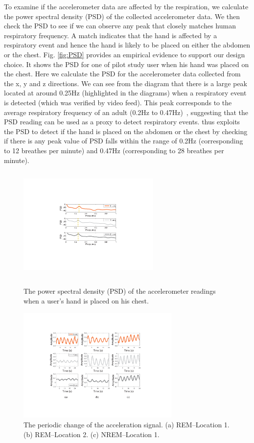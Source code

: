 To examine if the accelerometer data are affected by the respiration, we calculate the power spectral density (PSD) of the collected accelerometer data.  {We then check the PSD to see if we can observe any peak that closely matches human respiratory frequency}. A match indicates that the hand is affected by a respiratory event and hence the hand is likely to be placed on either the abdomen or the chest. Fig. \ref{fig:PSD} provides an empirical evidence to support our design choice. It shows the PSD for one of pilot study user when his hand was placed on the chest. Here we calculate the PSD for the accelerometer data collected from the x, y and z directions. We can see from the diagram that there is a large peak located at around 0.25Hz (highlighted in the diagrams) when a respiratory event is detected (which was verified by video feed). This peak corresponds to the average respiratory frequency of an adult (0.2Hz to 0.47Hz)~\cite{Breath_frequence}, suggesting that the PSD reading can be used as a proxy to detect respiratory events. {\systemname} thus exploits the PSD to detect if the hand is placed on the abdomen or the chest by checking if there is any peak value of PSD falls within the range of 0.2Hz (corresponding to 12 breathes per minute) and 0.47Hz (corresponding to 28 breathes per minute).

\begin{figure}[!t]
	\centering
	\begin{minipage}[t]{.4\textwidth}
	\centering
\includegraphics[width=7cm,height=5.7cm]{Figures/PSD.pdf}
\caption{The power spectral density (PSD) of the accelerometer readings when a user's hand is placed on his chest.}\label{fig:PSD}
	\end{minipage}%
\hfill
	\begin{minipage}[t]{.55\textwidth}
	\centering
	\includegraphics[width=8cm,height=5.7cm]{Figures/breath_ok1.pdf}
	\caption{The periodic change of the acceleration signal. (a) REM--Location 1. (b) REM--Location 2.  (c) NREM--Location 1.}\label{fig:breath_ok1}
	\end{minipage}
\end{figure}

